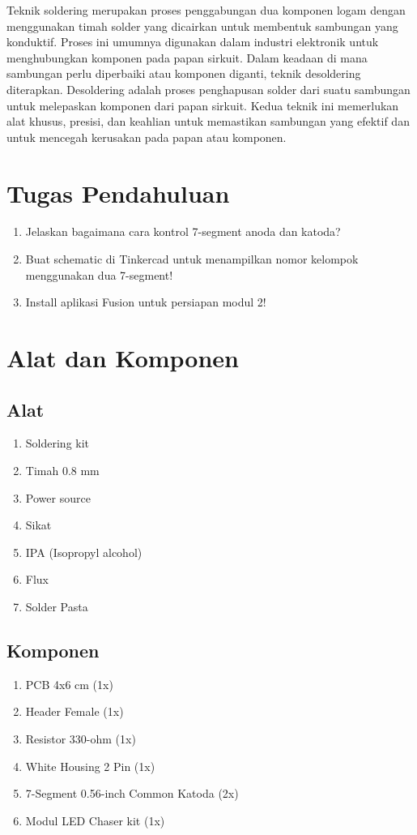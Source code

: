 Teknik soldering merupakan proses penggabungan dua komponen logam dengan menggunakan timah solder yang dicairkan untuk membentuk sambungan yang konduktif. 
Proses ini umumnya digunakan dalam industri elektronik untuk menghubungkan komponen pada papan sirkuit. Dalam keadaan di mana sambungan perlu diperbaiki 
atau komponen diganti, teknik desoldering diterapkan. Desoldering adalah proses penghapusan solder dari suatu sambungan untuk melepaskan komponen dari papan sirkuit. 
Kedua teknik ini memerlukan alat khusus, presisi, dan keahlian untuk memastikan sambungan yang efektif dan untuk mencegah kerusakan pada papan atau komponen.


\section{Tugas Pendahuluan}
\begin{enumerate}
    \item Jelaskan bagaimana cara kontrol 7-segment anoda dan katoda?
    \item Buat schematic di Tinkercad untuk menampilkan nomor kelompok menggunakan dua 7-segment!
    \item Install aplikasi Fusion untuk persiapan modul 2!
\end{enumerate}

\section{Alat dan Komponen}
\subsection{Alat}
\begin{enumerate}
    \item Soldering kit
    \item Timah 0.8 mm
    \item Power source
    \item Sikat 
    \item IPA (Isopropyl alcohol)
    \item Flux
    \item Solder Pasta
\end{enumerate}

\subsection{Komponen}
\begin{enumerate}
    \item PCB 4x6 cm                        (1x)
    \item Header Female                     (1x)
    \item Resistor 330-ohm 			        (1x)
    \item White Housing 2 Pin			    (1x)
    \item 7-Segment 0.56-inch Common Katoda	(2x)
    \item Modul LED Chaser kit              (1x)
\end{enumerate}
